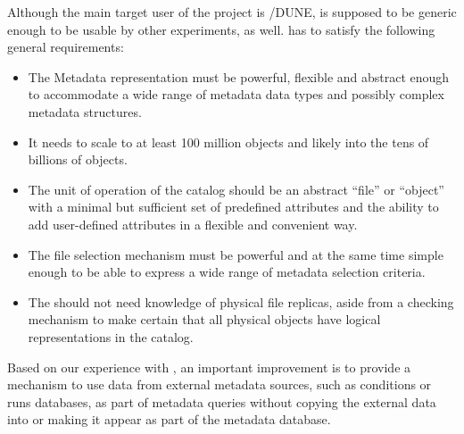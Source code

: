 \documentclass[../main-v1.tex]{subfiles}
\begin{document}
Although the main target user of the project is /DUNE,  is supposed to be generic enough to be usable by %
other experiments, as well.    has to satisfy the following general requirements: 

\begin{itemize} 
\item 
The Metadata representation must be powerful, flexible and abstract enough to accommodate a wide range of metadata data types and possibly complex metadata structures. 

\item
It needs to scale to at least 100 million objects and likely into the tens of billions of objects. %

\item
The unit of operation of the catalog should be an abstract ``file'' or ``object'' with a  minimal but sufficient set of predefined   attributes and the ability to add user-defined   attributes in a flexible and convenient way. 

\item 
The file selection mechanism must be powerful and at the same time simple enough to be able to express a wide range of metadata selection criteria. 

\item 
The  should not need knowledge of physical file replicas, aside from a checking mechanism to make certain that all physical objects have logical representations in the catalog. 

\end{itemize} 
 

Based on our experience with , an important improvement is to provide a mechanism to use data from external metadata sources, such as conditions or runs databases, as part of metadata queries without copying the external data into or making it appear as part of the metadata database. 
\end{document}
